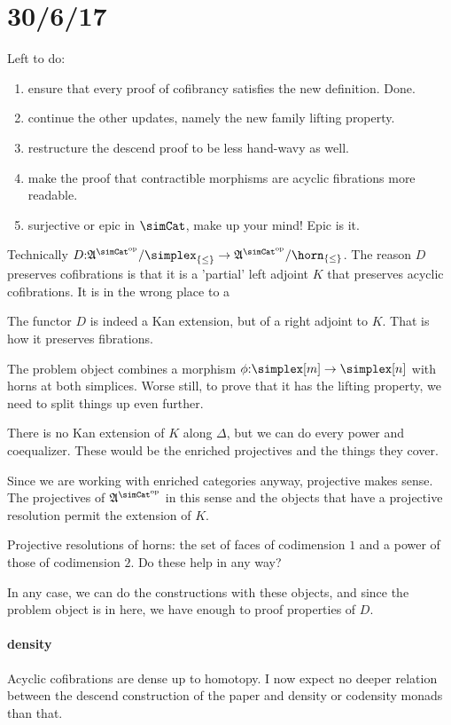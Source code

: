 \documentclass[csh.tex]{subfiles}
\begin{document}
\section{30/6/17}
Left to do:
\begin{enumerate}
\item ensure that every proof of cofibrancy satisfies the new definition.
Done.

\item continue the other updates, namely the new family lifting property.
\item restructure the descend proof to be less hand-wavy as well.

\item make the proof that contractible morphisms are acyclic fibrations more readable.
\item surjective or epic in $\simCat$, make up your mind!
Epic is it.
\end{enumerate}


Technically $D\of \ambient\s/\simplex_{\set\leq} \to \ambient\s/\horn_{\set\leq}$.
The reason $D$ preserves cofibrations is that it is a 'partial' left adjoint $K$ that preserves acyclic cofibrations. It is in the wrong place to a 

The functor $D$ is indeed a Kan extension, but of a right adjoint to $K$.
That is how it preserves fibrations.

The problem object combines a morphism $\phi\of\simplex[m]\to\simplex[n]$ with horns at both simplices. Worse still, to prove that it has the lifting property, we need to split things up even further.

There is no Kan extension of $K$ along $\Delta$, but we can do every power and coequalizer.
These would be the enriched projectives and the things they cover.

Since we are working with enriched categories anyway, projective makes sense. The projectives of $\ambient\s$ in this sense and the objects that have a projective resolution permit the extension of $K$.

Projective resolutions of horns: the set of faces of codimension $1$ and a power of those of codimension $2$. Do these help in any way?

In any case, we can do the constructions with these objects,
and since the problem object is in here, we have enough to proof properties of $D$.

\paragraph{density}
Acyclic cofibrations are dense up to homotopy. I now expect no deeper relation between the descend construction of the paper and density or codensity monads than that.
\end{document}
